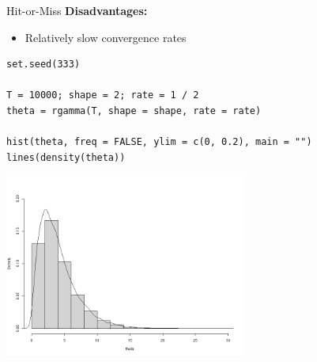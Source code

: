 \documentclass[11pt,compress,t,notes=noshow, xcolor=table]{beamer}
\begin{document}
\begin{vbframe}{Hit-or-Miss}
\textbf{Disadvantages:}
\begin{itemize}
\item Relatively slow convergence rates
\end{itemize}


%
%

%

\begin{center}
\begin{scriptsize}
\begin{verbatim}
set.seed(333)

T = 10000; shape = 2; rate = 1 / 2
theta = rgamma(T, shape = shape, rate = rate)

hist(theta, freq = FALSE, ylim = c(0, 0.2), main = "")
lines(density(theta))
\end{verbatim}
\end{scriptsize}

\includegraphics[width =0.6\textwidth]{figure_man/gamdistri_monte_carlo.png}
\end{center}


\end{vbframe}
\end{document}
